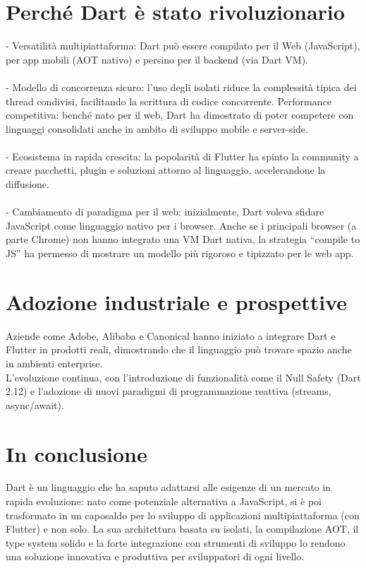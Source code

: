 \documentclass[14pt]{extbook}
\begin{document}
\section{Perché Dart è stato rivoluzionario}
- Versatilità multipiattaforma: Dart può essere compilato per il Web (JavaScript), per app mobili (AOT nativo) e persino per il backend (via Dart VM).\\\\
- Modello di concorrenza sicuro: l’uso degli isolati riduce la complessità tipica dei thread condivisi, facilitando la scrittura di codice concorrente.
Performance competitiva: benché nato per il web, Dart ha dimostrato di poter competere con linguaggi consolidati anche in ambito di sviluppo mobile e server-side.\\\\
- Ecosistema in rapida crescita: la popolarità di Flutter ha spinto la community a creare pacchetti, plugin e soluzioni attorno al linguaggio, accelerandone la diffusione.\\\\
- Cambiamento di paradigma per il web: inizialmente, Dart voleva sfidare JavaScript come linguaggio nativo per i browser. Anche se i principali browser (a parte Chrome) non hanno integrato una VM Dart nativa, la strategia “compile to JS” ha permesso di mostrare un modello più rigoroso e tipizzato per le web app.
\pagebreak

\section{Adozione industriale e prospettive}
Aziende come Adobe, Alibaba e Canonical hanno iniziato a integrare Dart e Flutter in prodotti reali, dimostrando che il linguaggio può trovare spazio anche in ambienti enterprise.\\

L’evoluzione continua, con l’introduzione di funzionalità come il Null Safety (Dart 2.12) e l’adozione di nuovi paradigmi di programmazione reattiva (streams, async/await).\\

\section{In conclusione}
Dart è un linguaggio che ha saputo adattarsi alle esigenze di un mercato in rapida evoluzione: nato come potenziale alternativa a JavaScript, si è poi trasformato in un caposaldo per lo sviluppo di applicazioni multipiattaforma (con Flutter) e non solo. La sua architettura basata su isolati, la compilazione AOT, il type system solido e la forte integrazione con strumenti di sviluppo lo rendono una soluzione innovativa e produttiva per sviluppatori di ogni livello.\\
\end{document}
